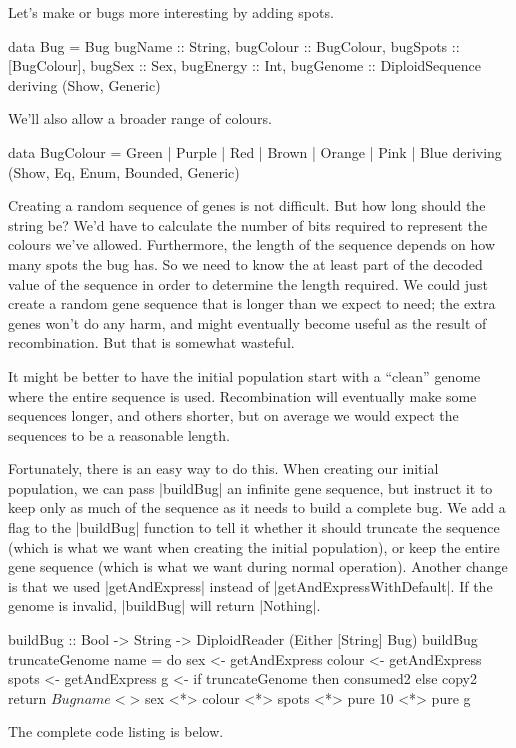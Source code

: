 Let's make or bugs more interesting by adding spots.
\begin{code}
data Bug = Bug
  { 
    bugName :: String,
    bugColour :: BugColour,
    bugSpots :: [BugColour],
    bugSex :: Sex,
    bugEnergy :: Int,
    bugGenome :: DiploidSequence
  } deriving (Show, Generic)
\end{code} 

We'll also allow a broader range of colours.

\begin{code}
data BugColour = Green | Purple | Red | Brown | Orange | Pink | Blue
  deriving (Show, Eq, Enum, Bounded, Generic)
\end{code} 

Creating a random sequence of genes is not difficult.
But how long should the string be?
We'd have to calculate the number of bits required
to represent the colours we've allowed.
Furthermore, the length of the sequence depends
on how many spots the bug has.
So we need to know the at least part of the decoded value of the sequence
in order to determine the length required.
We could just create a random gene sequence that is longer than we expect to need;
the extra genes won't do any harm, and might eventually become useful as the result of recombination.
But that is somewhat wasteful.

It might be better to have the initial population start with a ``clean'' genome
where the entire sequence is used.
Recombination will eventually make some sequences longer, and others shorter,
but on average we would expect the sequences to be a reasonable length.

Fortunately, there is an easy way to do this.
When creating our initial population, we can pass |buildBug| an infinite gene sequence,
but instruct it to keep only as much of the sequence as it needs to build a complete bug.
We add a flag to the |buildBug| function to tell it whether it should truncate the sequence
(which is what we want when creating the initial population),
or keep the entire gene sequence
(which is what we want during normal operation). 
Another change is that we used |getAndExpress| instead of
|getAndExpressWithDefault|.
If the genome is invalid, |buildBug| will return |Nothing|.

\begin{code}
buildBug :: Bool -> String -> DiploidReader (Either [String] Bug)
buildBug truncateGenome name = do
  sex <- getAndExpress
  colour <- getAndExpress
  spots <- getAndExpress
  g <- if truncateGenome then consumed2 else copy2
  return $ Bug name <$> sex <*> colour <*> spots <*> pure 10 <*> pure g
\end{code} 

The complete code listing is below.


